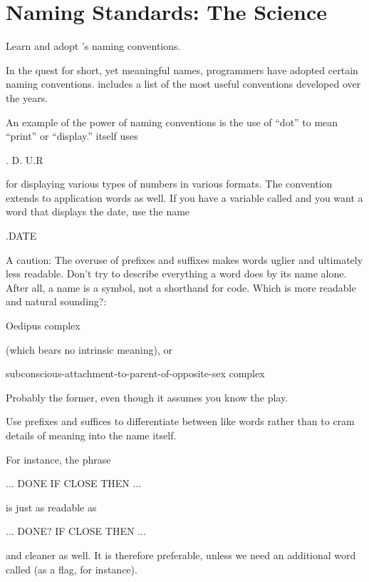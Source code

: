 \section{Naming Standards: The Science}%

\begin{tip}
Learn and adopt \Forth{}'s naming conventions.
\end{tip}
In the quest for short, yet meaningful names, \Forth{} programmers
have adopted certain naming conventions.   includes a list of
the most useful conventions developed over the years.

An example of the power of naming conventions is the use of ``dot''
to mean ``print'' or ``display.'' \Forth{} itself uses
\begin{Code}
.   D.   U.R
\end{Code}
for displaying various types of numbers in various formats.  The
convention extends to application words as well.  If you have a
variable called  and you want a word that displays the
date, use the name
\begin{Code}
.DATE
\end{Code}
%
%
A caution: The overuse of prefixes and suffixes makes words uglier and
ultimately less readable.  Don't try to describe everything a word
does by its name alone.  After all, a name is a symbol, not a
shorthand for code.  Which is more readable and natural sounding?:

\begin{tfquot}
Oedipus complex
\end{tfquot}
(which bears no intrinsic meaning), or
\begin{tfquot}
subconscious-attachment-to-parent-of-opposite-sex complex
\end{tfquot}
Probably the former, even though it assumes you know the play.

\begin{tip}
Use prefixes and suffices to differentiate between like words rather
than to cram details of meaning into the name itself.
\end{tip}
For instance, the phrase
\begin{Code}
... DONE IF CLOSE THEN ...
\end{Code}
is just as readable as
\begin{Code}
... DONE? IF CLOSE THEN ...
\end{Code}
and cleaner as well.  It is therefore preferable, unless we need an
additional word called  (as a flag, for instance).

